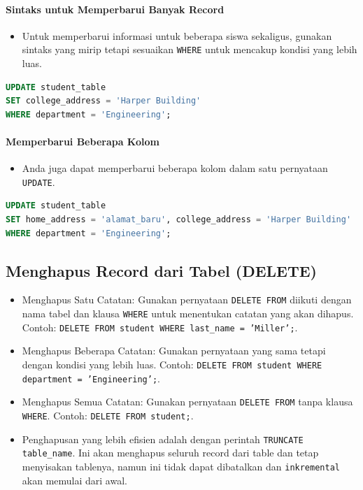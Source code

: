 \documentclass{article}
\begin{document}
\paragraph{Sintaks untuk Memperbarui Banyak Record}
\begin{itemize}
    \item Untuk memperbarui informasi untuk beberapa siswa sekaligus, gunakan sintaks yang mirip tetapi sesuaikan \texttt{WHERE} untuk mencakup kondisi yang lebih luas.
\end{itemize}
\begin{lstlisting}[language=SQL, caption={Contoh UPDATE Banyak Record}, captionpos=b]
UPDATE student_table 
SET college_address = 'Harper Building' 
WHERE department = 'Engineering';
\end{lstlisting}
\paragraph{Memperbarui Beberapa Kolom}
\begin{itemize}
    \item Anda juga dapat memperbarui beberapa kolom dalam satu pernyataan \texttt{UPDATE}.
\end{itemize}
\begin{lstlisting}[language=SQL, caption={Contoh UPDATE Beberapa Kolom}, captionpos=b]
UPDATE student_table  
SET home_address = 'alamat_baru', college_address = 'Harper Building'  
WHERE department = 'Engineering';
\end{lstlisting}

\subsection{Menghapus Record dari Tabel (DELETE)}
\begin{itemize}
    \item Menghapus Satu Catatan: Gunakan pernyataan \texttt{DELETE FROM} diikuti dengan nama tabel dan klausa \texttt{WHERE} untuk menentukan catatan yang akan dihapus. Contoh: \texttt{DELETE FROM student WHERE last\_name = 'Miller';}.
    \item Menghapus Beberapa Catatan: Gunakan pernyataan yang sama tetapi dengan kondisi yang lebih luas. Contoh: \texttt{DELETE FROM student WHERE department = 'Engineering';}.
    \item Menghapus Semua Catatan: Gunakan pernyataan \texttt{DELETE FROM} tanpa klausa \texttt{WHERE}. Contoh: \texttt{DELETE FROM student;}.
    \item Penghapusan yang lebih efisien adalah dengan perintah \texttt{TRUNCATE table\_name}. Ini akan menghapus seluruh record dari table dan tetap menyisakan tablenya, namun ini tidak dapat dibatalkan dan \texttt{inkremental} akan memulai dari awal.
\end{itemize}
\end{document}
